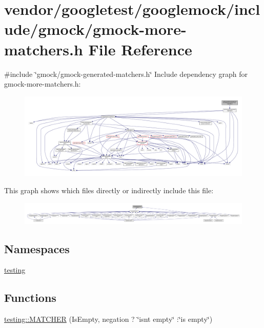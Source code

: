 \hypertarget{gmock-more-matchers_8h}{}\section{vendor/googletest/googlemock/include/gmock/gmock-\/more-\/matchers.h File Reference}
\label{gmock-more-matchers_8h}
{\ttfamily \#include \char`\"{}gmock/gmock-\/generated-\/matchers.\+h\char`\"{}}\newline
Include dependency graph for gmock-\/more-\/matchers.h\+:
\nopagebreak
\begin{figure}[H]
\begin{center}
\leavevmode
\includegraphics[width=350pt]{gmock-more-matchers_8h__incl}
\end{center}
\end{figure}
This graph shows which files directly or indirectly include this file\+:
\nopagebreak
\begin{figure}[H]
\begin{center}
\leavevmode
\includegraphics[width=350pt]{gmock-more-matchers_8h__dep__incl}
\end{center}
\end{figure}
\subsection*{Namespaces}
\begin{DoxyCompactItemize}
\item 
 \hyperlink{namespacetesting}{testing}
\end{DoxyCompactItemize}
\subsection*{Functions}
\begin{DoxyCompactItemize}
\item 
\hyperlink{namespacetesting_a4fcb3f407119590471bea5a90a8d2dda}{testing\+::\+M\+A\+T\+C\+H\+ER} (Is\+Empty, negation ? \char`\"{}isn\textquotesingle{}t empty\char`\"{} \+:\char`\"{}is empty\char`\"{})
\end{DoxyCompactItemize}
